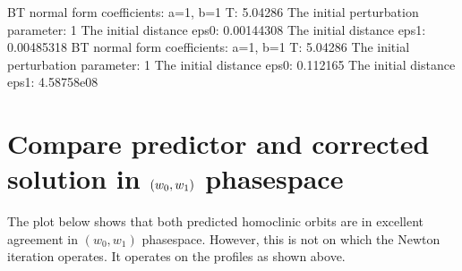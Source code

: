 \documentclass[letterpaper,10pt,english]{jupyterBook}
\begin{document}
\begin{sphinxVerbatim}[commandchars=\\\{\}]
\end{sphinxVerbatim}

\begin{sphinxVerbatim}[commandchars=\\\{\}]
BT normal form coefficients:
a=\PYGZhy{}1,	 b=1
T: 5.04286
The initial perturbation parameter:  1
The initial distance eps0: 0.00144308
The initial distance eps1: 0.00485318
BT normal form coefficients:
a=\PYGZhy{}1,	 b=1
T: 5.04286
The initial perturbation parameter:  1
The initial distance eps0: 0.112165
The initial distance eps1: 4.58758e\PYGZhy{}08
\end{sphinxVerbatim}

\noindent{}


\section{Compare predictor and corrected solution in \protect\((w_0, w_1)\protect\) phase\sphinxhyphen{}space}
\label{\detokenize{BogdanovTakens:compare-predictor-and-corrected-solution-in-w-0-w-1-phase-space}}
\sphinxAtStartPar
The plot below shows that both predicted homoclinic orbits are in excellent
agreement in \((w_0, w_1)\) phase\sphinxhyphen{}space. However, this is not on which the Newton
iteration operates. It operates on the profiles as shown above.
\end{document}
